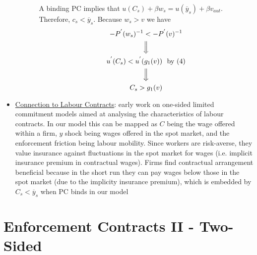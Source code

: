 \documentclass{article}
\begin{document}
\begin{itemize}
\begin{itemize}
\begin{itemize}
            \newline
            A binding PC implies that $u(C_{s}) + \beta w_{s} = u(\overline{y}_{s}) + \beta v_{aut}$. Therefore, $c_{s} < \overline{y}_{s}$. Because $w_{s} > v$ we have
            \begin{gather*}
                -P^{'}(w_{s})^{-1} < -P^{'}(v)^{-1} \\
                \Big\Downarrow \\
                u^{'}(C_{s}) < u^{'}(g_{1}(v)) \ \ \text{by (4)} \\
                \Big\Downarrow \\
                C_{s} > g_{1}(v)
            \end{gather*}
        \end{itemize}
    \end{itemize}
    \item \underline{Connection to Labour Contracts}: early work on one-sided limited commitment models aimed at analysing the characteristics of labour contracts. In our model this can be mapped as $C$ being the wage offered within a firm, $y$ shock being wages offered in the spot market, and the enforcement friction being labour mobility. Since workers are risk-averse, they value insurance against fluctuations in the spot market for wages (i.e. implicit insurance premium in contractual wages). Firms find contractual arrangement beneficial because in the short run they can pay wages below those in the spot market (due to the implicity insurance premium), which is embedded by $C_{s} < \overline{y}_{s}$ when PC binds in our model
\end{itemize}

\newpage

\section{Enforcement Contracts II - Two-Sided}
\end{document}
